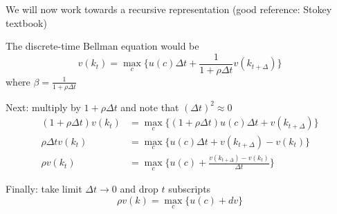\documentclass[11pt, aspectratio=169]{beamer}
\newenvironment{witemize}{\itemize\addtolength{\itemsep}{10pt}}{\enditemize}
\begin{document}
\begin{frame}{}
\begin{witemize}
\item We will now work towards a recursive representation (good reference: Stokey textbook)

\item The discrete-time Bellman equation would be
\begin{equation*}
	v(k_t) = \max_c \Big\{ u(c) \Delta t + \frac{1}{1 + \rho \Delta t} v(k_{t+\Delta}) \Big\}
\end{equation*}
where $\beta = \frac{1}{1+ \rho \Delta t}$

\item Next: multiply by $1 + \rho \Delta t$ and note that $(\Delta t)^2 \approx 0$
\begin{align*}
	(1 + \rho \Delta t) v(k_t) &= \max_c \Big\{ (1 + \rho \Delta t) u(c) \Delta t + v(k_{t+\Delta}) \Big\} \\
	\rho \Delta t v(k_t) &= \max_c \Big\{ u(c) \Delta t + v(k_{t+\Delta}) - v(k_t) \Big\} \\
	\rho v(k_t) &= \max_c \Big\{ u(c) + \frac{v(k_{t+\Delta}) - v(k_t)}{\Delta t} \Big\}
\end{align*}

\item Finally: take limit $\Delta t \to 0$ and drop $t$ subscripts
\begin{equation*}
	\rho v(k) = \max_c \Big\{ u(c) + dv \Big\}
\end{equation*}
\end{witemize}
\end{frame}
\end{document}
